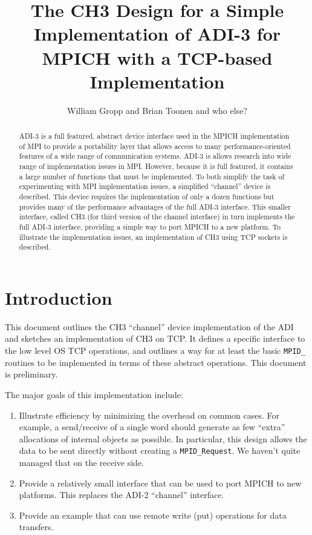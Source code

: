 \documentclass{article}
\def\code{\begingroup\makeustext\eatcode}
\def\eatcode#1{\texttt{#1}\endgroup}
\begin{document}
\title{The CH3 Design for a Simple Implementation of ADI-3 for MPICH with a
TCP-based Implementation}
\author{William Gropp and Brian Toonen and who else?}
\maketitle

\begin{abstract}
ADI-3 is a full featured, abstract device interface used in the MPICH
implementation of MPI to provide a portability layer that allows
access to many performance-oriented features of a wide range of
communication systems.  ADI-3 is allows research into wide range of
implementation issues in MPI. However, because it is full featured,
it contains a large number of functions that must be implemented.  To
both simplify the task of experimenting with MPI implementation
issues, a simplified ``channel'' device is described.  This device
requires the implementation of only a dozen functions but provides
many of the performance advantages of the full ADI-3 interface.  This
smaller interface, called CH3 (for third version of the channel
interface) in turn implements the full ADI-3 interface, providing a
simple way to port MPICH to a new platform.  To illustrate the
implementation issues, an implementation of CH3 using TCP sockets is
described. 
\end{abstract}

\section{Introduction}
This document outlines the CH3 ``channel'' device implementation of
the ADI and sketches an implementation of CH3 on TCP.  It defines a
specific interface to the low level OS TCP operations, and outlines a way
for at least the basic \code{MPID_} routines to be implemented in terms of
these 
abstract operations.  This document is preliminary.

The major goals of this implementation include:
\begin{enumerate}
\item Illustrate efficiency by minimizing the overhead on common cases.
For example, a send/receive of a single word should generate as few ``extra''
allocations of internal objects as possible.  In particular, this
design allows the data to be sent directly without creating a
\code{MPID_Request}. We haven't quite managed that on the receive side.

\item Provide a relatively small interface that can be used to port
MPICH to new 
platforms.  This replaces the ADI-2 ``channel'' interface.

\item Provide an example that can use remote write (put) operations for data
transfers.  
\end{enumerate}
\end{document}
